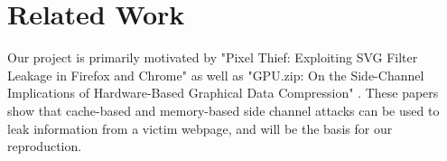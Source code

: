 \section{Related Work}
\label{sec:related_work}

Our project is primarily motivated by "Pixel Thief: Exploiting SVG Filter Leakage in Firefox and Chrome" \cite{294651} as well as "GPU.zip: On the Side-Channel Implications of Hardware-Based Graphical Data Compression" \cite{10646718}. These papers show that cache-based and memory-based side channel attacks can be used to leak information from a victim webpage, and will be the basis for our reproduction.
